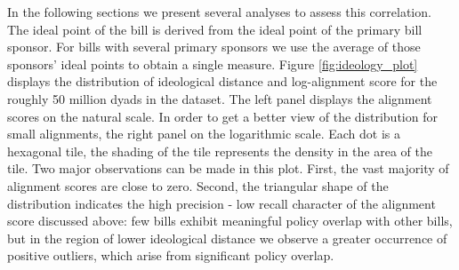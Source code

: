 \documentclass[12pt]{article} %
\begin{document}
In the following sections we present several analyses to assess this correlation. The ideal point of the bill is derived from the ideal point of the primary bill sponsor. For bills with several primary sponsors we use the average of those sponsors' ideal points to obtain a single measure. Figure \ref{fig:ideology_plot} displays the distribution of ideological distance and log-alignment score for the roughly 50 million dyads in the dataset. The left panel displays the alignment scores on the natural scale. In order to get a better view of the distribution for small alignments, the right panel on the logarithmic scale. Each dot is a hexagonal tile, the shading of the tile represents the density in the area of the tile. Two major observations can be made in this plot. First, the vast majority of alignment scores are close to zero. Second, the triangular shape of the distribution indicates the high precision - low recall character of the alignment score discussed above: few bills exhibit meaningful policy overlap with other bills, but in the region of lower ideological distance we observe a greater occurrence of positive outliers, which arise from significant policy overlap. 
\end{document}
